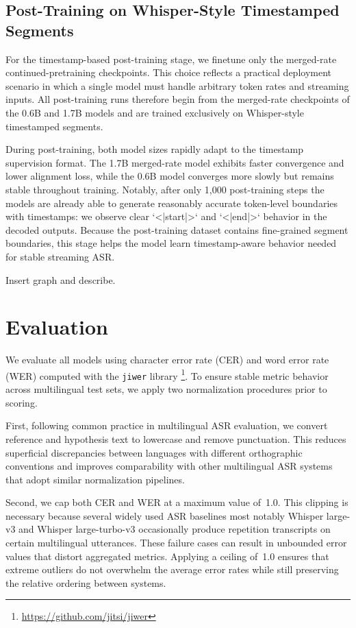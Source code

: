 \documentclass{article}
\begin{document}
\subsection{Post-Training on Whisper-Style Timestamped Segments}

For the timestamp-based post-training stage, we finetune only the merged-rate continued-pretraining 
checkpoints. This choice reflects a practical deployment scenario in which a single model must 
handle arbitrary token rates and streaming inputs. All post-training runs therefore begin from 
the merged-rate checkpoints of the 0.6B and 1.7B models and are trained exclusively on 
Whisper-style timestamped segments.

During post-training, both model sizes rapidly adapt to the timestamp supervision format. The 1.7B merged-rate model exhibits faster convergence and lower alignment loss, while the 0.6B model converges more slowly but remains stable throughout training. Notably, after only 1{,}000 post-training steps the models are already able to generate reasonably accurate token-level boundaries with timestamps: we observe clear `<|start|>` and `<|end|>` behavior in the decoded outputs. Because the post-training dataset contains fine-grained segment boundaries, this stage helps the model learn timestamp-aware behavior needed for stable streaming ASR.

Insert graph and describe.

\section{Evaluation}

We evaluate all models using character error rate (CER) and word error rate (WER) computed with the \texttt{jiwer} library \footnote{ \url{https://github.com/jitsi/jiwer}}. To ensure stable metric behavior across multilingual test sets, we apply two normalization procedures prior to scoring.

First, following common practice in multilingual ASR evaluation, we convert reference and hypothesis text to lowercase and remove punctuation. This reduces superficial discrepancies between languages with different orthographic conventions and improves comparability with other multilingual ASR systems that adopt similar normalization pipelines.

Second, we cap both CER and WER at a maximum value of~1.0. This clipping is necessary because several widely used ASR baselines most notably Whisper large-v3 and Whisper large-turbo-v3 occasionally produce repetition transcripts on certain multilingual utterances. These failure cases can result in unbounded error values that distort aggregated metrics. Applying a ceiling of~1.0 ensures that extreme outliers do not overwhelm the average error rates while still preserving the relative ordering between systems.
\end{document}
